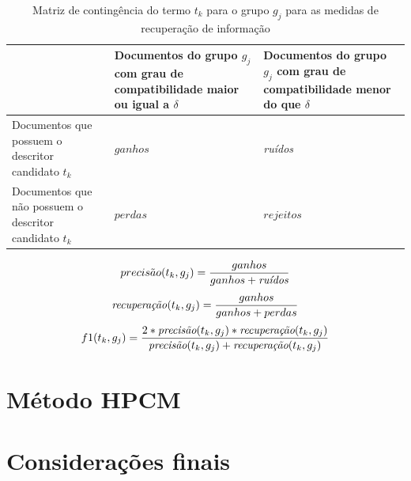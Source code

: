 \begin{table}[!htp]
  \centering
  \begin{tabular}{ |p{5cm}|p{5cm}|p{5cm}|}
    \cline{2-3}
    \multicolumn{1}{p{5cm}|}{} & Documentos do grupo $g_j$ com grau de compatibilidade 
    maior ou igual a $\delta$ &
    Documentos do grupo $g_j$ com grau de compatibilidade menor do que $\delta$ \\
    \hline
    Documentos que possuem o descritor candidato $t_k$ & \parbox[c]{5cm}{\centering $ganhos$} &
    \parbox[c]{5cm}{\centering \it ruídos\/} \\
    \hline
    Documentos que não possuem o descritor candidato $t_k$ & \parbox[c]{5cm}{\centering $perdas$} &
    \parbox[c]{5cm}{\centering $rejeitos$} \\
    \hline
  \end{tabular}
  \caption{Matriz de contingência do termo $t_k$ para o grupo $g_j$ para as medidas de recuperação
  de informação}
  \label{table:softmatrix}
\end{table}

\begin{equation}
  precis\tilde{a}o(t_k,g_j) = \frac{ganhos}{ganhos + \text{\it ruídos}}
  \label{eq:precision}
\end{equation}
\begin{equation}
  \text{\it recuperação\/}(t_k,g_j) = \frac{ganhos}{ganhos + perdas}
  \label{eq:recall}
\end{equation}
\begin{equation}
  f1(t_k,g_j) = \frac{2 * \text{\it precisão}(t_k,g_j) * \text{\it recuperação}(t_k,g_j)}
  {\text{\it precisão}(t_k,g_j) + \text{\it recuperação}(t_k,g_j)}
  \label{eq:fmeasure}
\end{equation}


\section{Método HPCM}
\section{Considerações finais}
